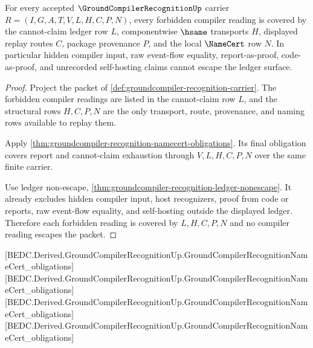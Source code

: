 \begin{theorem}
\label{thm:groundcompiler-recognition-cannot-claim-ledger-coverage}
For every accepted $\GroundCompilerRecognitionUp$ carrier $R=(I,G,A,T,V,L,H,C,P,N)$, every forbidden compiler reading is covered by the cannot-claim ledger row $L$, componentwise $\hsame$ transports $H$, displayed replay routes $C$, package provenance $P$, and the local $\NameCert$ row $N$. In particular hidden compiler input, raw event-flow equality, report-as-proof, code-as-proof, and unrecorded self-hosting claims cannot escape the ledger surface.
\end{theorem}
\begin{proof}
Project the packet of \autoref{def:groundcompiler-recognition-carrier}. The forbidden compiler readings are listed in the cannot-claim row $L$, and the structural rows $H,C,P,N$ are the only transport, route, provenance, and naming rows available to replay them.

Apply \autoref{thm:groundcompiler-recognition-namecert-obligations}. Its final obligation covers report and cannot-claim exhaustion through $V,L,H,C,P,N$ over the same finite carrier.

Use ledger non-escape, \autoref{thm:groundcompiler-recognition-ledger-nonescape}. It already excludes hidden compiler input, host recognizers, proof from code or reports, raw event-flow equality, and self-hosting outside the displayed ledger. Therefore each forbidden reading is covered by $L,H,C,P,N$ and no compiler reading escapes the packet.
\end{proof}

[BEDC.Derived.GroundCompilerRecognitionUp.GroundCompilerRecognitionNameCert\_obligations]
[BEDC.Derived.GroundCompilerRecognitionUp.GroundCompilerRecognitionNameCert\_obligations]
[BEDC.Derived.GroundCompilerRecognitionUp.GroundCompilerRecognitionNameCert\_obligations]
[BEDC.Derived.GroundCompilerRecognitionUp.GroundCompilerRecognitionNameCert\_obligations]

